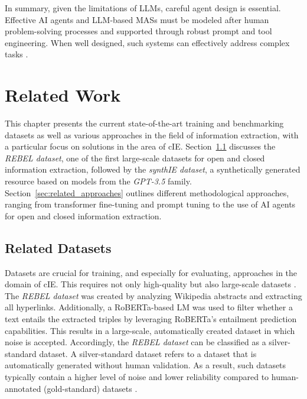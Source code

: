 \documentclass[a4paper,oneside,bibliography=totoc]{scrbook}
\begin{document}
In summary, given the limitations of \acp{LLM}, careful agent design is essential. Effective \ac{AI} agents and \ac{LLM}-based \acp{MAS} must be modeled after human problem-solving processes and supported through robust prompt and tool engineering. When well designed, such systems can effectively address complex tasks \cite{Hadfield2025}.

\chapter{Related Work}
\label{ch:related_work_chapter}

This chapter presents the current state-of-the-art training and benchmarking datasets as well as various approaches in the field of information extraction, with a particular focus on solutions in the area of \ac{cIE}. Section~\ref{sec:related_datasets} discusses the \textit{REBEL dataset}, one of the first large-scale datasets for open and closed information extraction, followed by the \textit{synthIE dataset}, a synthetically generated resource based on models from the \textit{GPT-3.5} family. Section~\ref{sec:related_approaches} outlines different methodological approaches, ranging from transformer fine-tuning and prompt tuning to the use of \ac{AI} agents for open and closed information extraction.

\section{Related Datasets}
\label{sec:related_datasets}

Datasets are crucial for training, and especially for evaluating, approaches in the domain of \ac{cIE}. This requires not only high-quality but also large-scale datasets \cite{Josifoski2023}. The \textit{REBEL dataset} was created by analyzing Wikipedia abstracts and extracting all hyperlinks. Additionally, a RoBERTa-based \ac{LM} was used to filter whether a text entails the extracted triples by leveraging RoBERTa’s entailment prediction capabilities. This results in a large-scale, automatically created dataset in which noise is accepted. Accordingly, the \textit{REBEL dataset} can be classified as a silver-standard dataset. A silver-standard dataset refers to a dataset that is automatically generated without human validation. As a result, such datasets typically contain a higher level of noise and lower reliability compared to human-annotated (gold-standard) datasets \cite{HuguetCabot2021}.
\end{document}
